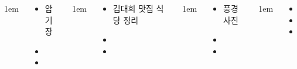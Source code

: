 \documentclass[	20pt, 
							a0paper, 
							landscape,
							margin=0mm, %
							innermargin=10mm,  		%
							blockverticalspace=4mm, %
							colspace=5mm, 
							subcolspace=0mm
							]{tikzposter}
\begin{document}
\begin{columns}

			{
					\setlength{\leftmargini}{4em}
					\setlength{\labelsep} {1em}
				\begin{LARGE}
					\begin{itemize}
					\item 암기장
					\item 
					\item 
					\end{itemize}
				\end{LARGE}
			} %


			{
					\setlength{\leftmargini}{4em}
					\setlength{\labelsep} {1em}
				\begin{LARGE}
					\begin{itemize}
					\item 김대희 맛집 식당 정리
					\item 
					\item 
					\end{itemize}
				\end{LARGE}
			} %

			{
					\setlength{\leftmargini}{4em}
					\setlength{\labelsep} {1em}
				\begin{LARGE}
					\begin{itemize}
					\item 풍경 사진
					\item 
					\item 
					\end{itemize}
				\end{LARGE}
			} %


			{
					\setlength{\leftmargini}{4em}
					\setlength{\labelsep} {1em}
				\begin{LARGE}
					\begin{itemize}
					\item 
					\item 
					\item 
					\end{itemize}
				\end{LARGE}
			} %





\end{columns}
\end{document}
